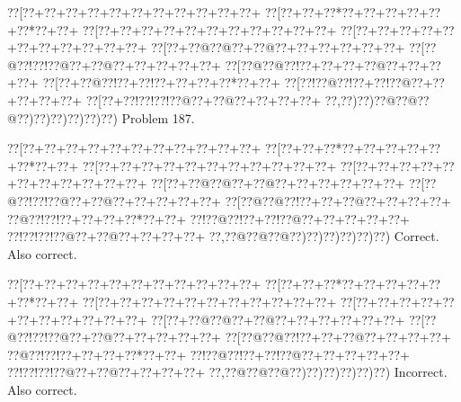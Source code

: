 \documentclass[a5paper]{article}
\begin{document}
\newpage
\begin{center}
{\goo
\0??[\0??+\0??+\0??+\0??+\0??+\0??+\0??+\0??+\0??+\0??+\0??+
\0??[\0??+\0??+\0??*\0??+\0??+\0??+\0??+\0??+\0??*\0??+\0??+
\0??[\0??+\0??+\0??+\0??+\0??+\0??+\0??+\0??+\0??+\0??+\0??+
\0??[\0??+\0??+\0??+\0??+\0??+\0??+\0??+\0??+\0??+\0??+\0??+
\0??[\0??+\0??@\0??@\0??+\0??@\0??+\0??+\0??+\0??+\0??+\0??+
\0??[\0??@\0??!\0??!\0??@\0??+\0??@\0??+\0??+\0??+\0??+\0??+
\0??[\0??@\0??@\0??!\0??+\0??+\0??+\0??@\0??+\0??+\0??+\0??+
\0??[\0??+\0??@\0??!\0??+\0??!\0??+\0??+\0??+\0??*\0??+\0??+
\0??[\0??!\0??@\0??!\0??+\0??!\0??@\0??+\0??+\0??+\0??+\0??+
\0??[\0??+\0??!\0??!\0??!\0??@\0??+\0??@\0??+\0??+\0??+\0??+
\0??,\0??)\0??)\0??@\0??@\0??@\0??)\0??)\0??)\0??)\0??)\0??)
}
Problem 187.

\end{center}
\begin{center}
{\goo
\0??[\0??+\0??+\0??+\0??+\0??+\0??+\0??+\0??+\0??+\0??+\0??+
\0??[\0??+\0??+\0??*\0??+\0??+\0??+\0??+\0??+\0??*\0??+\0??+
\0??[\0??+\0??+\0??+\0??+\0??+\0??+\0??+\0??+\0??+\0??+\0??+
\0??[\0??+\0??+\0??+\0??+\0??+\0??+\0??+\0??+\0??+\0??+\0??+
\0??[\0??+\0??@\0??@\0??+\0??@\0??+\0??+\0??+\0??+\0??+\0??+
\0??[\0??@\0??!\0??!\0??@\0??+\0??@\0??+\0??+\0??+\0??+\0??+
\0??[\0??@\0??@\0??!\0??+\0??+\0??@\0??+\0??+\0??+\0??+
\0??@\0??!\0??!\0??+\0??+\0??+\0??*\0??+\0??+
\0??!\0??@\0??!\0??+\0??!\0??@\0??+\0??+\0??+\0??+\0??+
\0??!\0??!\0??!\0??@\0??+\0??@\0??+\0??+\0??+\0??+
\0??,\0??@\0??@\0??@\0??)\0??)\0??)\0??)\0??)\0??)
}
Correct. Also correct.

\end{center}
\begin{center}
{\goo
\0??[\0??+\0??+\0??+\0??+\0??+\0??+\0??+\0??+\0??+\0??+\0??+
\0??[\0??+\0??+\0??*\0??+\0??+\0??+\0??+\0??+\0??*\0??+\0??+
\0??[\0??+\0??+\0??+\0??+\0??+\0??+\0??+\0??+\0??+\0??+\0??+
\0??[\0??+\0??+\0??+\0??+\0??+\0??+\0??+\0??+\0??+\0??+\0??+
\0??[\0??+\0??@\0??@\0??+\0??@\0??+\0??+\0??+\0??+\0??+\0??+
\0??[\0??@\0??!\0??!\0??@\0??+\0??@\0??+\0??+\0??+\0??+\0??+
\0??[\0??@\0??@\0??!\0??+\0??+\0??@\0??+\0??+\0??+\0??+
\0??@\0??!\0??!\0??+\0??+\0??+\0??*\0??+\0??+
\0??!\0??@\0??!\0??+\0??!\0??@\0??+\0??+\0??+\0??+\0??+
\0??!\0??!\0??!\0??@\0??+\0??@\0??+\0??+\0??+\0??+
\0??,\0??@\0??@\0??@\0??)\0??)\0??)\0??)\0??)\0??)
}
Incorrect. Also correct.

\end{center}
\end{document}
